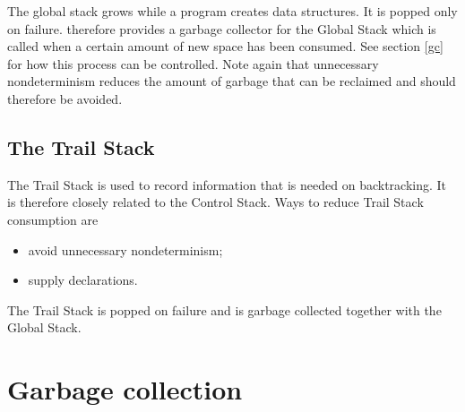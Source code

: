 The global stack grows while a program creates data structures.
It is popped only on failure. {\eclipse} therefore provides a garbage collector
for the Global Stack which is called when a certain amount
of new space has been consumed. See section \ref{gc} for how this process
can be controlled.
Note again that unnecessary nondeterminism reduces the amount of garbage
that can be reclaimed and should therefore be avoided.


\subsection{The Trail Stack}
The Trail Stack is used to record information that is needed on backtracking.
It is therefore closely related to the Control Stack.
Ways to reduce Trail Stack consumption are
\begin{itemize}
\item avoid unnecessary nondeterminism;
\item supply  declarations.
\end{itemize}
The Trail Stack is popped on failure and
is garbage collected together with the Global Stack.

\section{Garbage collection\label{gc}}

